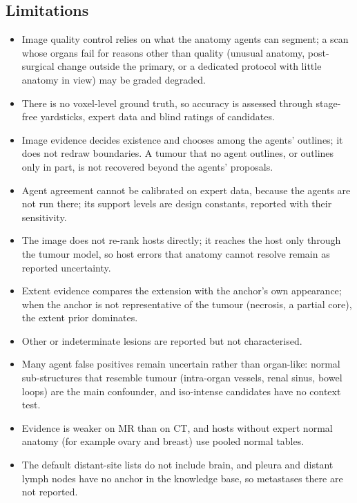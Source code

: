 \documentclass[fleqn,10pt]{olplainarticle}
\begin{document}
\subsection{Limitations}
\begin{itemize}
  \item Image quality control relies on what the anatomy agents can segment; a scan whose organs fail for reasons other than quality (unusual anatomy, post-surgical change outside the primary, or a dedicated protocol with little anatomy in view) may be graded degraded.
  \item There is no voxel-level ground truth, so accuracy is assessed through stage-free yardsticks, expert data and
  blind ratings of candidates.
  \item Image evidence decides existence and chooses among the agents' outlines; it does not redraw boundaries. A tumour
  that no agent outlines, or outlines only in part, is not recovered beyond the agents' proposals.
  \item Agent agreement cannot be calibrated on expert data, because the agents are not run there; its support levels are
  design constants, reported with their sensitivity.
  \item The image does not re-rank hosts directly; it reaches the host only through the tumour model, so host errors that
  anatomy cannot resolve remain as reported uncertainty.
  \item Extent evidence compares the extension with the anchor's own appearance; when the anchor is not representative of
  the tumour (necrosis, a partial core), the extent prior dominates.
  \item Other or indeterminate lesions are reported but not characterised.
  \item Many agent false positives remain uncertain rather than organ-like: normal sub-structures that resemble tumour
  (intra-organ vessels, renal sinus, bowel loops) are the main confounder, and iso-intense candidates have no context test.
  \item Evidence is weaker on MR than on CT, and hosts without expert normal anatomy (for example ovary and breast) use pooled
  normal tables.
  \item The default distant-site lists do not include brain, and pleura and distant lymph nodes have no anchor in
  the knowledge base, so metastases there are not reported.
\end{itemize}
\end{document}

